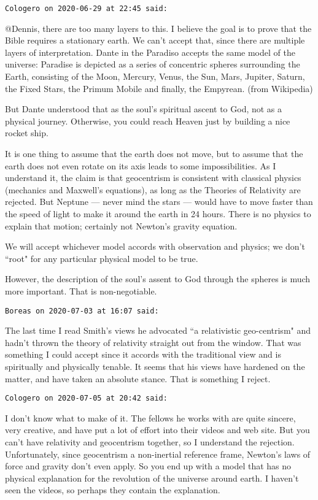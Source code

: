 \begin{footnotesize}
\begin{sffamily}
\hfill

\texttt{Cologero on 2020-06-29 at 22:45 said: }

@Dennis, there are too many layers to this. I believe the goal is to prove that the Bible requires a stationary earth. We can't accept that, since there are multiple layers of interpretation. Dante in the Paradiso accepts the same model of the universe: Paradise is depicted as a series of concentric spheres surrounding the Earth, consisting of the Moon, Mercury, Venus, the Sun, Mars, Jupiter, Saturn, the Fixed Stars, the Primum Mobile and finally, the Empyrean. (from Wikipedia)

But Dante understood that as the soul's spiritual ascent to God, not as a physical journey. Otherwise, you could reach Heaven just by building a nice rocket ship.

It is one thing to assume that the earth does not move, but to assume that the earth does not even rotate on its axis leads to some impossibilities. As I understand it, the claim is that geocentrism is consistent with classical physics (mechanics and Maxwell's equations), as long as the Theories of Relativity are rejected. But Neptune — never mind the stars — would have to move faster than the speed of light to make it around the earth in 24 hours. There is no physics to explain that motion; certainly not Newton's gravity equation.

We will accept whichever model accords with observation and physics; we don't ``root" for any particular physical model to be true.

However, the description of the soul's assent to God through the spheres is much more important. That is non-negotiable.


\hfill

\texttt{Boreas on 2020-07-03 at 16:07 said: }

The last time I read Smith's views he advocated ``a relativistic geo-centrism" and hadn't thrown the theory of relativity straight out from the window. That was something I could accept since it accords with the traditional view and is spiritually and physically tenable. It seems that his views have hardened on the matter, and have taken an absolute stance. That is something I reject.


\hfill

\texttt{Cologero on 2020-07-05 at 20:42 said: }

I don't know what to make of it. The fellows he works with are quite sincere, very creative, and have put a lot of effort into their videos and web site. But you can't have relativity and geocentrism together, so I understand the rejection. Unfortunately, since geocentrism a non-inertial reference frame, Newton's laws of force and gravity don't even apply. So you end up with a model that has no physical explanation for the revolution of the universe around earth. I haven't seen the videos, so perhaps they contain the explanation.



\end{sffamily}
\end{footnotesize}
